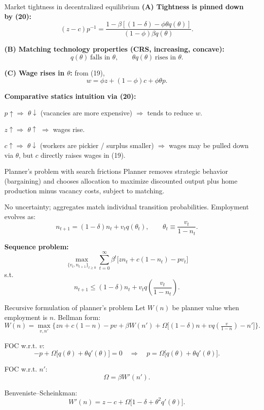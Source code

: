\documentclass[aspectratio=169,xcolor=dvipsnames]{beamer}
\let\tempone\itemize
\let\temptwo\enditemize
\renewenvironment{itemize}{\tempone\addtolength{\itemsep}{\fill}}{\temptwo}
\begin{document}
\begin{frame}{Market tightness in decentralized equilibrium}
\label{slide:MP_44_ThetaCS}
\small
\textbf{(A) Tightness is pinned down by (20):}
\[
(z-c)p^{-1}
=
\frac{1-\beta[(1-\delta)-\phi\theta q(\theta)]}{(1-\phi)\beta q(\theta)}.
\]

\textbf{(B) Matching technology properties (CRS, increasing, concave):}
\[
q(\theta)\ \text{falls in }\theta,\qquad
\theta q(\theta)\ \text{rises in }\theta.
\]

\textbf{(C) Wage rises in \(\theta\):} from (19),
\[
w = \phi z + (1-\phi)c + \phi\theta p.
\]

\medskip
\textbf{Comparative statics intuition via (20):}
\begin{itemize}
    \item \(p\uparrow \Rightarrow\) \(\theta\downarrow\) (vacancies are more expensive) \(\Rightarrow\) tends to reduce \(w\).
    \item \(z\uparrow \Rightarrow\) \(\theta\uparrow\) \(\Rightarrow\) wages rise.
    \item \(c\uparrow \Rightarrow\) \(\theta\downarrow\) (workers are pickier / surplus smaller) \(\Rightarrow\) wages may be pulled down via \(\theta\), but \(c\) directly raises wages in (19).
\end{itemize}
\end{frame}

\begin{frame}{Planner's problem with search frictions}
\label{slide:MP_45_PlannerSeq}
\small
Planner removes strategic behavior (bargaining) and chooses allocation to maximize discounted output plus home production minus vacancy costs,
subject to matching.

\medskip
No uncertainty; aggregates match individual transition probabilities.
Employment evolves as:
\[
n_{t+1} = (1-\delta)n_t + v_t q(\theta_t),
\qquad
\theta_t \equiv \frac{v_t}{1-n_t}.
\]

\textbf{Sequence problem:}
\[
\max_{\{v_t,n_{t+1}\}_{t\ge0}} \sum_{t=0}^{\infty}\beta^t\big[z n_t + c(1-n_t) - p v_t\big]
\tag{22}
\]
s.t.
\[
n_{t+1}\le (1-\delta)n_t + v_t q\!\left(\frac{v_t}{1-n_t}\right).
\tag{23}
\]
\end{frame}

\begin{frame}{Recursive formulation of planner's problem}
\label{slide:MP_46_PlannerRec}
\small
Let \(W(n)\) be planner value when employment is \(n\). Bellman form:
\[
W(n)=\max_{v,n'}\Big\{
zn + c(1-n) - pv + \beta W(n') + \Omega\big[(1-\delta)n + v q(\tfrac{v}{1-n}) - n'\big]
\Big\}.
\]

FOC w.r.t. \(v\):
\[
-p + \Omega\Big[q(\theta) + \theta q'(\theta)\Big]=0
\quad\Rightarrow\quad
p=\Omega\Big[q(\theta)+\theta q'(\theta)\Big].
\tag{24}
\]

FOC w.r.t. \(n'\):
\[
\Omega = \beta W'(n').
\tag{25}
\]

Benveniste--Scheinkman:
\[
W'(n)= z-c + \Omega\Big[1-\delta + \theta^2 q'(\theta)\Big].
\tag{26}
\]
\end{frame}
\end{document}
